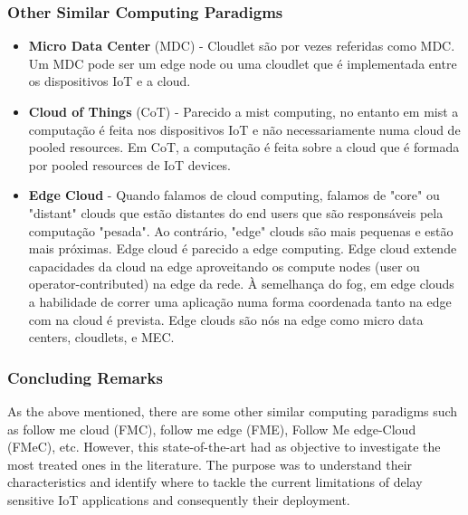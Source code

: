 \subsubsection{Other Similar Computing Paradigms}
\begin{itemize}
	\item \textbf{Micro Data Center} (MDC) - Cloudlet são por vezes referidas
	como MDC. Um MDC pode ser um edge node ou uma cloudlet que é implementada
	entre os dispositivos IoT e a cloud.
	\item \textbf{Cloud of Things} (CoT) - Parecido a mist computing, no entanto
	em mist a computação é feita nos dispositivos IoT e não necessariamente numa
	cloud de pooled resources. Em CoT, a computação é feita sobre a cloud que é
	formada por pooled resources de IoT devices.
	\item \textbf{Edge Cloud} - Quando falamos de cloud computing, falamos de
	"core" ou "distant" clouds que estão distantes do end users que são
	responsáveis pela computação "pesada". Ao contrário, "edge" clouds são mais
	pequenas e estão mais próximas. Edge cloud é parecido a edge computing. Edge
	cloud extende capacidades da cloud na edge aproveitando os compute nodes
	(user ou operator-contributed) na edge da rede. À semelhança do fog, em edge
	clouds a habilidade de correr uma aplicação numa forma coordenada tanto na
	edge com na cloud é prevista. Edge clouds são nós na edge como micro data
	centers, cloudlets, e MEC.
\end{itemize}

\subsubsection{Concluding Remarks}
As the above mentioned, there are some other similar computing paradigms such as follow me cloud (FMC), follow me edge (FME), Follow Me edge-Cloud (FMeC), etc. However, this state-of-the-art had as objective to investigate the most treated ones in the literature. The purpose was to understand their characteristics and identify where to tackle the current limitations of delay sensitive IoT applications and consequently their deployment.

